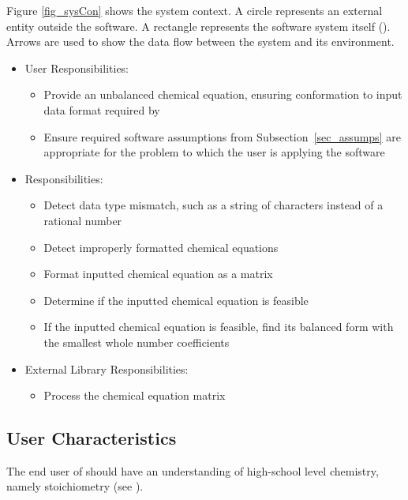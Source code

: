 \documentclass[12pt]{article}
\begin{document}
Figure \ref{fig_sysCon} shows the system context. A circle represents an
external entity outside the software. A rectangle represents the software system
itself (\progname{}). Arrows are used to show the data flow between the system
and its environment.

\begin{itemize}
  \item User Responsibilities:
        \begin{itemize}
          \item Provide an unbalanced chemical equation, ensuring conformation to input
                data format required by \progname{}
          \item Ensure required software assumptions from Subsection~\ref{sec_assumps}
                are appropriate for the problem to which the user is applying the software
        \end{itemize}
  \item \progname{} Responsibilities:
        \begin{itemize}
          \item Detect data type mismatch, such as a string of characters instead of a
                rational number
          \item Detect improperly formatted chemical equations
          \item Format inputted chemical equation as a matrix
          \item Determine if the inputted chemical equation is feasible
          \item If the inputted chemical equation is feasible, find its balanced form with
                the smallest whole number coefficients
        \end{itemize}
  \item External Library Responsibilities:
        \begin{itemize}
          \item Process the chemical equation matrix 
        \end{itemize}
\end{itemize}

\subsection{User Characteristics} \label{sec_userChars}

The end user of \progname{} should have an understanding of high-school level
chemistry, namely stoichiometry (see ).
\end{document}
